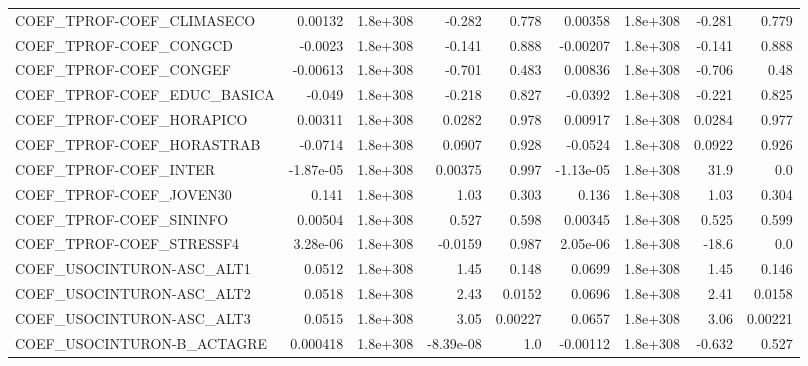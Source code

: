 \begin{tabular}{lrrrrrrrr}
COEF\_TPROF-COEF\_CLIMASECO         &     0.00132 &     1.8e+308 &    -0.282 &    0.778 &    0.00358 &    1.8e+308 &       -0.281 &         0.779 \\
COEF\_TPROF-COEF\_CONGCD            &     -0.0023 &     1.8e+308 &    -0.141 &    0.888 &   -0.00207 &    1.8e+308 &       -0.141 &         0.888 \\
COEF\_TPROF-COEF\_CONGEF            &    -0.00613 &     1.8e+308 &    -0.701 &    0.483 &    0.00836 &    1.8e+308 &       -0.706 &          0.48 \\
COEF\_TPROF-COEF\_EDUC\_BASICA       &      -0.049 &     1.8e+308 &    -0.218 &    0.827 &    -0.0392 &    1.8e+308 &       -0.221 &         0.825 \\
COEF\_TPROF-COEF\_HORAPICO          &     0.00311 &     1.8e+308 &    0.0282 &    0.978 &    0.00917 &    1.8e+308 &       0.0284 &         0.977 \\
COEF\_TPROF-COEF\_HORASTRAB         &     -0.0714 &     1.8e+308 &    0.0907 &    0.928 &    -0.0524 &    1.8e+308 &       0.0922 &         0.926 \\
COEF\_TPROF-COEF\_INTER             &   -1.87e-05 &     1.8e+308 &   0.00375 &    0.997 &  -1.13e-05 &    1.8e+308 &         31.9 &           0.0 \\
COEF\_TPROF-COEF\_JOVEN30           &       0.141 &     1.8e+308 &      1.03 &    0.303 &      0.136 &    1.8e+308 &         1.03 &         0.304 \\
COEF\_TPROF-COEF\_SININFO           &     0.00504 &     1.8e+308 &     0.527 &    0.598 &    0.00345 &    1.8e+308 &        0.525 &         0.599 \\
COEF\_TPROF-COEF\_STRESSF4          &    3.28e-06 &     1.8e+308 &   -0.0159 &    0.987 &   2.05e-06 &    1.8e+308 &        -18.6 &           0.0 \\
COEF\_USOCINTURON-ASC\_ALT1         &      0.0512 &     1.8e+308 &      1.45 &    0.148 &     0.0699 &    1.8e+308 &         1.45 &         0.146 \\
COEF\_USOCINTURON-ASC\_ALT2         &      0.0518 &     1.8e+308 &      2.43 &   0.0152 &     0.0696 &    1.8e+308 &         2.41 &        0.0158 \\
COEF\_USOCINTURON-ASC\_ALT3         &      0.0515 &     1.8e+308 &      3.05 &  0.00227 &     0.0657 &    1.8e+308 &         3.06 &       0.00221 \\
COEF\_USOCINTURON-B\_ACTAGRE        &    0.000418 &     1.8e+308 & -8.39e-08 &      1.0 &   -0.00112 &    1.8e+308 &       -0.632 &         0.527 \\

\end{tabular}
